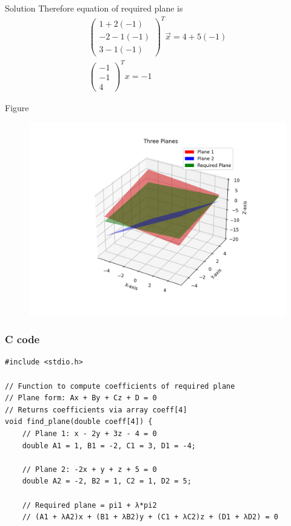 \documentclass{beamer}
\begin{document}
\begin{frame}{Solution}
Therefore equation of required plane is
\begin{align}
    \begin{pmatrix}1+2(-1)\\-2-1(-1)\\3-1(-1)\end{pmatrix}^T\vec{x}=4+5(-1)\\
    \begin{pmatrix}-1\\-1\\4\end{pmatrix}^Tx=-1
\end{align}
\end{frame}
\begin{frame}{Figure}
    \begin{figure}[H]
    \centering
    \includegraphics[width=0.95\columnwidth]{figs/Figure.png}
    \caption{}
    \label{fig:placeholder}
\end{figure}
\end{frame}
\begin{frame}[fragile]
\frametitle{C code}
\begin{lstlisting}
#include <stdio.h>

// Function to compute coefficients of required plane
// Plane form: Ax + By + Cz + D = 0
// Returns coefficients via array coeff[4]
void find_plane(double coeff[4]) {
    // Plane 1: x - 2y + 3z - 4 = 0
    double A1 = 1, B1 = -2, C1 = 3, D1 = -4;

    // Plane 2: -2x + y + z + 5 = 0
    double A2 = -2, B2 = 1, C2 = 1, D2 = 5;

    // Required plane = pi1 + λ*pi2
    // (A1 + λA2)x + (B1 + λB2)y + (C1 + λC2)z + (D1 + λD2) = 0
\end{lstlisting}
\end{frame}
\end{document}
